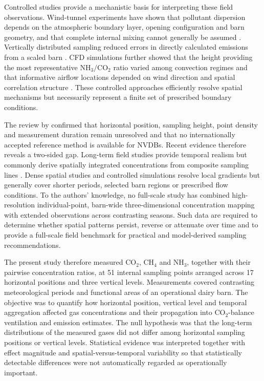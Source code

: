 \documentclass[12pt,a4paper]{article}
\begin{document}
Controlled studies provide a mechanistic basis for interpreting these field observations. Wind-tunnel experiments have shown that pollutant dispersion depends on the atmospheric boundary layer, opening configuration and barn geometry, and that complete internal mixing cannot generally be assumed \citep{Nosek2021}. Vertically distributed sampling reduced errors in directly calculated emissions from a scaled barn \citep{Janke2020}. CFD simulations further showed that the height providing the most representative \(\mathrm{NH_3}/\mathrm{CO_2}\) ratio varied among convection regimes and that informative airflow locations depended on wind direction and spatial correlation structure \citep{Doumbia2021,Chen2026}. These controlled approaches efficiently resolve spatial mechanisms but necessarily represent a finite set of prescribed boundary conditions.

The review by \citet{Apostolico2026} confirmed that horizontal position, sampling height, point density and measurement duration remain unresolved and that no internationally accepted reference method is available for NVDBs. Recent evidence therefore reveals a two-sided gap. Long-term field studies provide temporal realism but commonly derive spatially integrated concentrations from composite sampling lines \citep{JankeSampling2020,Janke2022,Declerck2025}. Dense spatial studies and controlled simulations resolve local gradients but generally cover shorter periods, selected barn regions or prescribed flow conditions. To the authors' knowledge, no full-scale study has combined high-resolution individual-point, barn-wide three-dimensional concentration mapping with extended observations across contrasting seasons. Such data are required to determine whether spatial patterns persist, reverse or attenuate over time and to provide a full-scale field benchmark for practical and model-derived sampling recommendations.

The present study therefore measured \(\mathrm{CO_2}\), \(\mathrm{CH_4}\) and \(\mathrm{NH_3}\), together with their pairwise concentration ratios, at 51 internal sampling points arranged across 17 horizontal positions and three vertical levels. Measurements covered contrasting meteorological periods and functional areas of an operational dairy barn. The objective was to quantify how horizontal position, vertical level and temporal aggregation affected gas concentrations and their propagation into \(\mathrm{CO_2}\)-balance ventilation and emission estimates. The null hypothesis was that the long-term distributions of the measured gases did not differ among horizontal sampling positions or vertical levels. Statistical evidence was interpreted together with effect magnitude and spatial-versus-temporal variability so that statistically detectable differences were not automatically regarded as operationally important.
\end{document}
